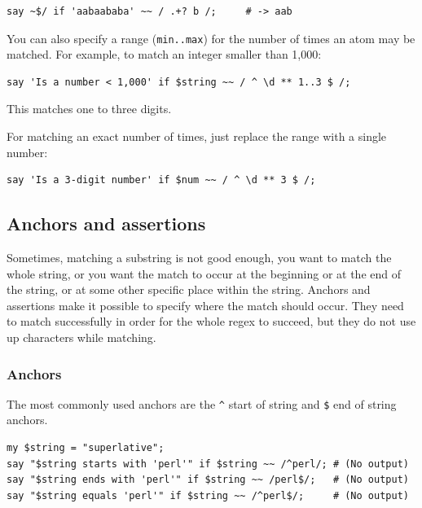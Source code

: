 \begin{verbatim}
say ~$/ if 'aabaababa' ~~ / .+? b /;     # -> aab
\end{verbatim}
%

You can also specify a range ({\tt min..max}) for the number of 
times an atom may be matched. For example, to match an 
integer smaller than 1,000:

\begin{verbatim}
say 'Is a number < 1,000' if $string ~~ / ^ \d ** 1..3 $ /;
\end{verbatim}
%

This matches one to three digits.

For matching an exact number of times, just replace the 
range with a single number:

\begin{verbatim}
say 'Is a 3-digit number' if $num ~~ / ^ \d ** 3 $ /;
\end{verbatim}
%

\subsection{Anchors and assertions}


Sometimes, matching a substring is not good enough, you  
want to match the whole string, or you want the match to occur 
at the beginning or at the end of the string, or at some 
other specific place within the string. Anchors and assertions 
make it possible to specify where the match should occur. 
They need to match successfully in order for the whole 
regex to succeed, but they do not use up characters 
while matching.

\subsubsection{Anchors}


The most commonly used anchors are the \verb'^' start of 
string and \verb'$' end of string anchors.

\begin{verbatim}
my $string = "superlative";
say "$string starts with 'perl'" if $string ~~ /^perl/; # (No output)
say "$string ends with 'perl'" if $string ~~ /perl$/;   # (No output)
say "$string equals 'perl'" if $string ~~ /^perl$/;     # (No output)
\end{verbatim}

